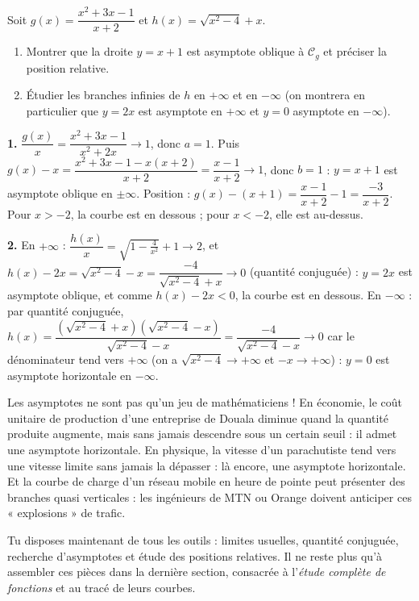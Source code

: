 \documentclass[11pt]{article}
\begin{document}
\begin{exercice}
Soit $g(x)=\dfrac{x^2+3x-1}{x+2}$ et $h(x)=\sqrt{x^2-4}+x$.
\begin{enumerate}
\item Montrer que la droite $y=x+1$ est asymptote oblique à $\mathcal{C}_g$ et préciser la position relative.
\item Étudier les branches infinies de $h$ en $+\infty$ et en $-\infty$ (on montrera en particulier que $y=2x$ est asymptote en $+\infty$ et $y=0$ asymptote en $-\infty$).
\end{enumerate}
\end{exercice}

\begin{corrige}
\textbf{1.} $\dfrac{g(x)}{x}=\dfrac{x^2+3x-1}{x^2+2x}\to 1$, donc $a=1$. Puis $g(x)-x=\dfrac{x^2+3x-1-x(x+2)}{x+2}=\dfrac{x-1}{x+2}\to 1$, donc $b=1$ : $y=x+1$ est asymptote oblique en $\pm\infty$. Position : $g(x)-(x+1)=\dfrac{x-1}{x+2}-1=\dfrac{-3}{x+2}$. Pour $x>-2$, la courbe est en dessous ; pour $x<-2$, elle est au-dessus.

\textbf{2.} En $+\infty$ : $\dfrac{h(x)}{x}=\sqrt{1-\frac{4}{x^2}}+1\to 2$, et $h(x)-2x=\sqrt{x^2-4}-x=\dfrac{-4}{\sqrt{x^2-4}+x}\to 0$ (quantité conjuguée) : $y=2x$ est asymptote oblique, et comme $h(x)-2x<0$, la courbe est en dessous. En $-\infty$ : par quantité conjuguée, $h(x)=\dfrac{(\sqrt{x^2-4}+x)(\sqrt{x^2-4}-x)}{\sqrt{x^2-4}-x}=\dfrac{-4}{\sqrt{x^2-4}-x}\to 0$ car le dénominateur tend vers $+\infty$ (on a $\sqrt{x^2-4}\to+\infty$ et $-x\to+\infty$) : $y=0$ est asymptote horizontale en $-\infty$.
\end{corrige}

\begin{savaistu}
Les asymptotes ne sont pas qu'un jeu de mathématiciens ! En économie, le coût unitaire de production d'une entreprise de Douala diminue quand la quantité produite augmente, mais sans jamais descendre sous un certain seuil : il admet une asymptote horizontale. En physique, la vitesse d'un parachutiste tend vers une vitesse limite sans jamais la dépasser : là encore, une asymptote horizontale. Et la courbe de charge d'un réseau mobile en heure de pointe peut présenter des branches quasi verticales : les ingénieurs de MTN ou Orange doivent anticiper ces « explosions » de trafic.
\end{savaistu}

Tu disposes maintenant de tous les outils : limites usuelles, quantité conjuguée, recherche d'asymptotes et étude des positions relatives. Il ne reste plus qu'à assembler ces pièces dans la dernière section, consacrée à l'\emph{étude complète de fonctions} et au tracé de leurs courbes.
\end{document}
